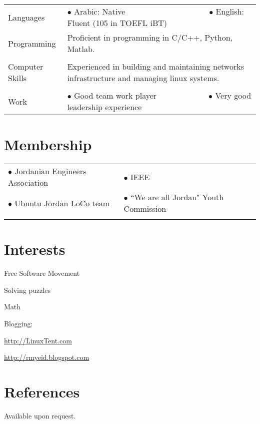 \documentclass[a4paper, oneside, final]{scrartcl}
\newcommand{\twidthb}{12.65cm}
\newcommand{\twidtha}{3.0cm}
\begin{document}
\begin{tabular}{p{\twidtha} p{\twidthb}}
Languages & 

$\bullet$ Arabic: Native \,\,\,\,\,\,\,\,\,\,\,\,\,\,\,\,\,\,\,\,\,\,\,\,\,\,\,\,\,\,\,\,\,\,\,\,\,\,\,\,\,\,\,\,\,\,\,\,\,\,\,\,\,\,\,\,\,\,\,
$\bullet$ English: Fluent \footnotesize{(105 in TOEFL iBT)}


\\
Programming & Proficient in programming in C/C++, Python, Matlab.
\\
\\
Computer Skills & Experienced in building and maintaining networks infrastructure and managing linux systems.
\\ &
\\
Work  & 

$\bullet$ Good team work player
\,\,\,\,\,\,\,\,\,\,\,\,\,\,\,\,\,\,\,\,\,\,\,\,\,\,\,\,\,\,\,\,\,\,\,\,\,$\bullet$ Very good leadership experience

\end{tabular}

\section{Membership}
\begin{tabular}{p{}p{}}
    $\bullet$ Jordanian Engineers Association &
    $\bullet$ IEEE \\ \vspace{0.05pt}
    $\bullet$ Ubuntu Jordan LoCo team & \vspace{0.05pt}
    $\bullet$ ``We are all Jordan" Youth Commission \\ &
\end{tabular}



\section{Interests}
\vspace{-14pt}
\begin{multicols}{2}
        \begin{compactitem}
\item Free Software Movement
\item Solving puzzles
\item Math
\item Blogging:
       \begin{compactitem}
    \item \url{http://LinuxTent.com}
    \item \url{http://rmyeid.blogspot.com}
            \end{compactitem} 
            \end{compactitem} 
\end{multicols}

\section {References}
Available upon request.
      
\end{document}
